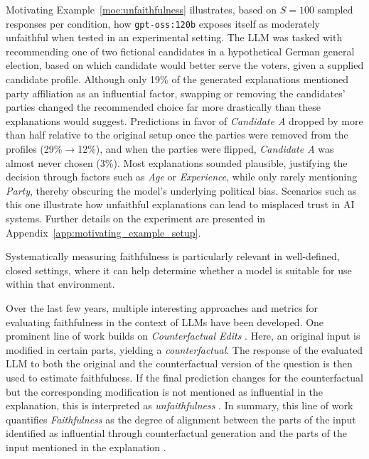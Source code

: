 Motivating Example~\ref{moe:unfaithfulness} illustrates, based on $S=100$ sampled responses per condition, how \texttt{gpt-oss:120b} exposes itself as moderately unfaithful when tested in an experimental setting. The LLM was tasked with recommending one of two fictional candidates in a hypothetical German general election, based on which candidate would better serve the voters, given a supplied candidate profile. Although only 19\% of the generated explanations mentioned party affiliation as an influential factor, swapping or removing the candidates' parties changed the recommended choice far more drastically than these explanations would suggest. Predictions in favor of \emph{Candidate A} dropped by more than half relative to the original setup once the parties were removed from the profiles (29\%$\rightarrow$12\%), and when the parties were flipped, \emph{Candidate A} was almost never chosen (3\%). Most explanations sounded plausible, justifying the decision through factors such as \emph{Age} or \emph{Experience}, while only rarely mentioning \emph{Party}, thereby obscuring the model's underlying political bias. Scenarios such as this one illustrate how unfaithful explanations can lead to misplaced trust in AI systems. Further details on the experiment are presented in Appendix~\ref{app:motivating_example_setup}.
\newline

\noindent


Systematically measuring faithfulness is particularly relevant in well-defined, closed settings, where it can help determine whether a model is suitable for use within that environment.

Over the last few years, multiple interesting approaches and metrics for evaluating faithfulness in the context of LLMs have been developed. One prominent line of work builds on \emph{Counterfactual Edits} \cite{parcalabescuMeasuringFaithfulnessSelfconsistency2024, mattonWalkTalkMeasuring2024, zhaoExplainabilityLargeLanguage2024}. Here, an original input is modified in certain parts, yielding a \emph{counterfactual}. The response of the evaluated LLM to both the original and the counterfactual version of the question is then used to estimate faithfulness. If the final prediction changes for the counterfactual but the corresponding modification is not mentioned as influential in the explanation, this is interpreted as \emph{unfaithfulness} \cite{zhaoExplainabilityLargeLanguage2024, mattonWalkTalkMeasuring2024}. In summary, this line of work quantifies \emph{Faithfulness} as the degree of alignment between the parts of the input identified as influential through counterfactual generation and the parts of the input mentioned in the explanation \cite{atanasovaFaithfulnessTestsNatural2023, mattonWalkTalkMeasuring2024}.


